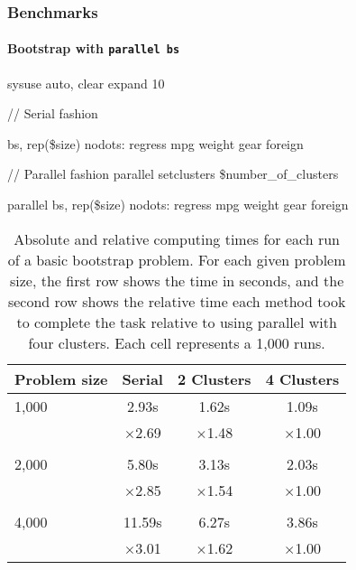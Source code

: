 \documentclass[9pt,\ExtraDocOpts]{beamer}
\begin{document}
\begin{frame}[t]
\frametitle{Benchmarks}
\framesubtitle{Bootstrap with \tt{parallel bs}}
\begin{semiverbatim}
	\scriptsize
sysuse auto, clear
expand 10


// Serial fashion

bs, rep(\$size) nodots: regress mpg weight gear foreign


// Parallel fashion
parallel setclusters \$number\_of\_clusters

parallel bs, rep(\$size) nodots: regress mpg weight gear foreign
\end{semiverbatim}
\pause{}

\begin{table}[!h]
\centering\begin{tabular}{l*{3}{c}}
	\toprule
	Problem size & Serial & 2 Clusters & 4 Clusters\\\midrule
	1,000 &   2.93s &   1.62s &   1.09s \\    
	&  $\times$2.69 &  $\times$1.48 &  $\times$1.00 \\ \\
	2,000 &   5.80s &   3.13s &   2.03s \\    
	&  $\times$2.85 &  $\times$1.54 &  $\times$1.00 \\ \\
	4,000 &  11.59s &   6.27s &   3.86s \\    
	&  $\times$3.01 &  $\times$1.62 &  $\times$1.00 \\
	\bottomrule
\end{tabular}
\caption{Absolute and relative computing times for each run of a basic bootstrap problem. For each given problem size, the first row shows the time in seconds, and the second row shows the relative time each method took to complete the task relative to using parallel with four clusters. Each cell represents a 1,000 runs.}
	\end{table}
	
\end{frame}
\end{document}
